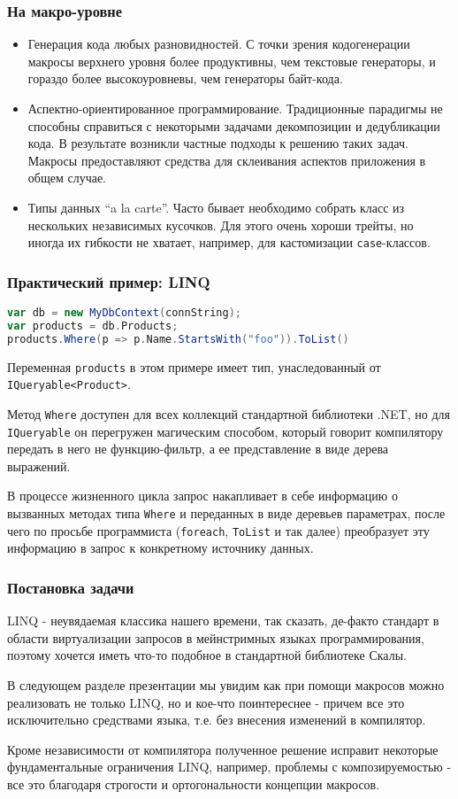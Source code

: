 \documentclass[hyperref={bookmarks=false}]{beamer}
\begin{document}
\begin{frame}[t]
\frametitle{На макро-уровне}
\begin{itemize}
\item Генерация кода любых разновидностей. С точки зрения кодогенерации макросы верхнего уровня более продуктивны, чем текстовые генераторы, и гораздо более высокоуровневы, чем генераторы байт-кода.
\item Аспектно-ориентированное программирование. Традиционные парадигмы не способны справиться с некоторыми задачами декомпозиции и дедубликации кода. В результате возникли частные подходы к решению таких задач. Макросы предоставляют средства для склеивания аспектов приложения в общем случае.
\item Типы данных ``a la carte''. Часто бывает необходимо собрать класс из нескольких независимых кусочков. Для этого очень хороши трейты, но иногда их гибкости не хватает, например, для кастомизации \texttt{case}-классов. 
\end{itemize}
\end{frame}

\begin{frame}[fragile, t]
\frametitle{Практический пример: LINQ}

\begin{lstlisting}[language=scala]
var db = new MyDbContext(connString);
var products = db.Products;
products.Where(p => p.Name.StartsWith("foo")).ToList()
\end{lstlisting}

Переменная \texttt{products} в этом примере имеет тип, унаследованный от \texttt{IQueryable<Product>}. 

Метод \texttt{Where} доступен для всех коллекций стандартной библиотеки .NET, но для \texttt{IQueryable} он перегружен магическим способом, который говорит компилятору передать в него не функцию-фильтр, а ее представление в виде дерева выражений.

В процессе жизненного цикла запрос накапливает в себе информацию о вызванных методах типа \texttt{Where} и переданных в виде деревьев параметрах, после чего по просьбе программиста (\texttt{foreach}, \texttt{ToList} и так далее) преобразует эту информацию в запрос к конкретному источнику данных.
\end{frame}

\begin{frame}[t]
\frametitle{Постановка задачи}

LINQ - неувядаемая классика нашего времени, так сказать, де-факто стандарт в области виртуализации запросов в мейнстримных языках программирования, поэтому хочется иметь что-то подобное в стандартной библиотеке Скалы.

В следующем разделе презентации мы увидим как при помощи макросов можно реализовать не только LINQ, но и кое-что поинтереснее - причем все это исключительно средствами языка, т.е. без внесения изменений в компилятор.

Кроме независимости от компилятора полученное решение исправит некоторые фундаментальные ограничения LINQ, например, проблемы с композируемостью - все это благодаря строгости и ортогональности концепции макросов.
\end{frame}
\end{document}

